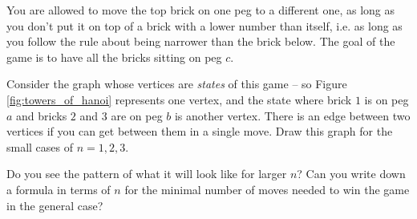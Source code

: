 \documentclass[nobib]{tufte-handout}
\begin{document}
You are allowed to move the top brick on one peg to a different one, as long as you don't put it on top of a brick with a lower number than itself, i.e. as long as you follow the rule about being narrower than the brick below. The goal of the game is to have all the bricks sitting on peg $c$.

\begin{xca}
  Consider the graph whose vertices are \emph{states} of this game -- so Figure \ref{fig:towers_of_hanoi} represents one vertex, and the state where brick $1$ is on peg $a$ and bricks $2$ and $3$ are on peg $b$ is another vertex. There is an edge between two vertices if you can get between them in a single move. Draw this graph for the small cases of $n=1, 2, 3$.

  Do you see the pattern of what it will look like for larger $n$? Can you write down a formula in terms of $n$ for the minimal number of moves needed to win the game in the general case?
\end{xca}

%
%
\end{document}
